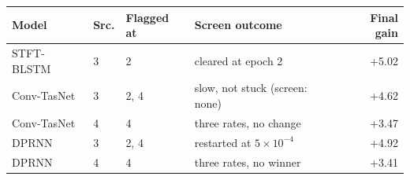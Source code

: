 \begin{tabular}{llllr}
\toprule
Model & Src. & Flagged at & Screen outcome & Final gain \\
\midrule
STFT-BLSTM & 3 & 2 & cleared at epoch 2 & +5.02 \\
Conv-TasNet & 3 & 2, 4 & slow, not stuck (screen: none) & +4.62 \\
Conv-TasNet & 4 & 4 & three rates, no change & +3.47 \\
DPRNN & 3 & 2, 4 & restarted at $5\times10^{-4}$ & +4.92 \\
DPRNN & 4 & 4 & three rates, no winner & +3.41 \\
\bottomrule
\end{tabular}
